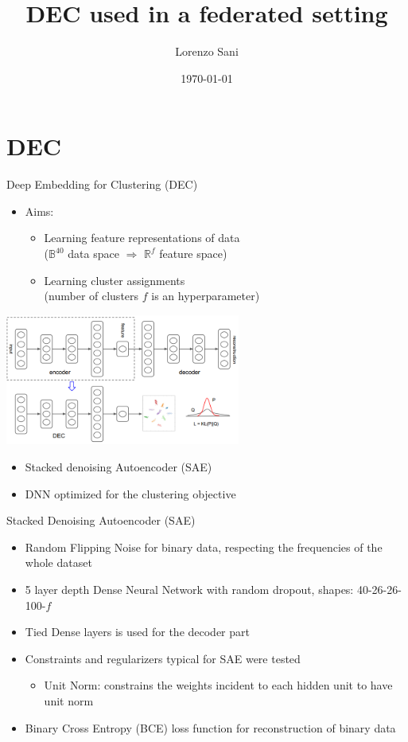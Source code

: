 \documentclass{beamer}
\title[Unsupervised Clustering in Federated Learning]{DEC used in a federated setting}
\author{Lorenzo Sani}
\institute{Università degli Studi di Bologna}
\date{\today}
\begin{document}
\begin{frame}
  \titlepage
\end{frame}


\section{DEC}

\begin{frame}{Deep Embedding for Clustering (DEC)\cite{DBLP:journals/corr/XieGF15}}
	\begin{itemize}
	\item Aims:
		\begin{itemize}
			\item Learning feature representations of data\\($\mathbb{B}^{40}$ data space $\Rightarrow$ 	$\mathbb{R}^f$ feature space)
			\item Learning cluster assignments\\(number of clusters $f$ is an hyperparameter)
		\end{itemize}
	\end{itemize}
	\centering
	\includegraphics[width=0.58\textwidth, keepaspectratio]{./images/DEC_model.png}
	\begin{itemize}
		\item Stacked denoising Autoencoder (SAE)
		\item DNN optimized for the clustering objective
	\end{itemize}
\end{frame}

\begin{frame}{Stacked Denoising Autoencoder (SAE)}
	\begin{itemize}
		\item Random Flipping Noise for binary data, respecting the frequencies of the whole dataset
		\item 5 layer depth Dense Neural Network with random dropout, shapes: 40-26-26-100-$f$
		\item Tied Dense layers is used for the decoder part
		\item Constraints and regularizers typical for SAE were tested
		\begin{itemize}
			\item Unit Norm: constrains the weights incident to each hidden unit to have unit norm 
		\end{itemize}
		\item Binary Cross Entropy (BCE) loss function for reconstruction of binary data
	\end{itemize}
\end{frame}
\end{document}
